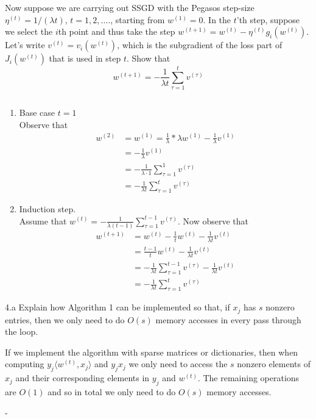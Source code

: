 \documentclass[12pt,letterpaper]{article}
\begin{document}
\begin{problem}{4.3}
Now suppose we are carrying out SSGD with the Pegasos
step-size $\eta^{(t)}=1/\left(\lambda t\right)$, $t=1,2,\ldots$.,
starting from $w^{(1)}=0$. In the $t$'th step, suppose we select
the $i$th point and thus take the step $w^{(t+1)}=w^{(t)}-\eta^{(t)}g_{i}(w^{(t)})$.
Let's write $v^{(t)}=v_{i}(w^{(t)})$, which is the subgradient of
the loss part of $J_{i}(w^{(t)})$ that is used in step $t$. Show
that
\[
w^{(t+1)}=-\frac{1}{\lambda t}\sum_{\tau=1}^{t}v^{(\tau)}
\]
\end{problem}
\begin{solution}{}
$\,$
    \begin{enumerate}
        \item Base case $t=1$\\
            Observe that
            \begin{align*}
                w^{(2)} &= w^{(1)} = \frac{1}{\lambda} * \lambda w^{(1)} - \frac{1}{\lambda} v^{(1)} \\
                &=  - \frac{1}{\lambda} v^{(1)}\\
                &=  - \frac{1}{\lambda \cdot 1} \sum_{\tau=1}^1 v^{(\tau)}\\
                &= - \frac{1}{\lambda t} \sum_{\tau=1}^t v^{(\tau)}
            \end{align*}
        
        \item Induction step.\\
            Assume that $w^{(t)}=-\frac{1}{\lambda (t-1)}\sum_{\tau=1}^{t-1}v^{(\tau)}$. Now observe that
            \begin{align*}
                w^{(t+1)} &= w^{(t)} - \frac{1}{t}w^{(t)} - \frac{1}{\lambda t}v^{(t)}\\
                &= \frac{t-1}{t}w^{(t)} - \frac{1}{\lambda t} v^{(t)}\\
                &= -\frac{1}{\lambda t} \sum_{\tau=1}^{t-1}v^{(\tau)} - \frac{1}{\lambda t}v^{(t)}\\
                &= -\frac{1}{\lambda t} \sum_{\tau=1}^{t}v^{(\tau)}
            \end{align*}
    \end{enumerate}
\end{solution}
\newpage

\begin{problem}{4.a}
Explain how Algorithm 1 can be implemented so that, if
$x_{j}$ has $s$ nonzero entries, then we only need to do $O(s)$
memory accesses in every pass through the loop.
\end{problem}
\begin{solution}{}
    If we implement the algorithm with sparse matrices or dictionaries, then when computing $y_j\langle w^{(t)}, x_j \rangle$
    and $y_jx_j$ we only need to access the $s$ nonzero elements of $x_j$ and their corresponding elements in $y_j$ and $w^{(t)}$.
    The remaining operations are $O(1)$ and so in total we only need to do $O(s)$ memory accesses.
\end{solution}
\newpage
-
\end{document}
